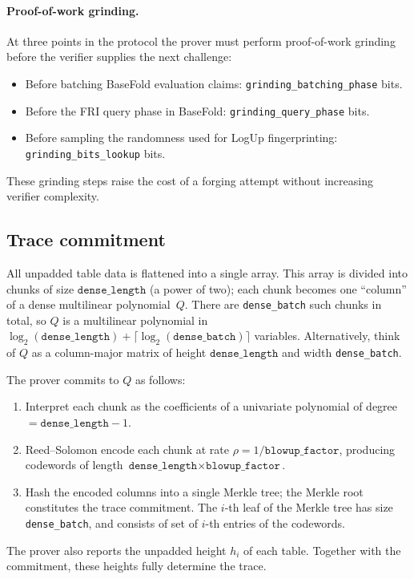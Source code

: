 \documentclass[11pt]{article}
\begin{document}
\paragraph{Proof-of-work grinding.}
At three points in the protocol the prover must perform proof-of-work
grinding before the verifier supplies the next challenge:
\begin{itemize}
\item Before batching BaseFold evaluation claims:
      \texttt{grinding\_batching\_phase} bits.
\item Before the FRI query phase in BaseFold:
      \texttt{grinding\_query\_phase} bits.
\item Before sampling the randomness used for LogUp fingerprinting: \texttt{grinding\_bits\_lookup} bits.
\end{itemize}
These grinding steps raise the cost of a forging attempt
without increasing verifier complexity.

\subsection{Trace commitment}\label{sec:trace-commit}

All unpadded table data is flattened into a single array.
This array is divided into chunks of size
$\texttt{dense\_length}$ (a power of two);
each chunk becomes one ``column'' of a dense multilinear polynomial~$Q$.
There are \texttt{dense\_batch} such chunks in total, so
$Q$ is a multilinear polynomial in
$\log_2(\texttt{dense\_length})+\lceil\log_2(\texttt{dense\_batch})\rceil$ variables.
Alternatively, think of $Q$ as a column-major matrix of height $\texttt{dense\_length}$
and width \texttt{dense\_batch}.

The prover commits to $Q$ as follows:
\begin{enumerate}
\item Interpret each chunk as the coefficients of a univariate polynomial of
      degree $=\texttt{dense\_length}-1$.
\item Reed--Solomon encode each chunk at rate $\rho=1/\texttt{blowup\_factor}$,
      producing codewords of length
      $\texttt{dense\_length}\times\texttt{blowup\_factor}$.
\item Hash the encoded columns into a single Merkle tree;
      the Merkle root constitutes the trace commitment. The $i$-th leaf of the Merkle tree has size
      \texttt{dense\_batch}, and consists of set of $i$-th entries of the codewords.
\end{enumerate}
The prover also reports the unpadded height $h_i$ of each table.
Together with the commitment, these heights fully determine the trace.
\end{document}
